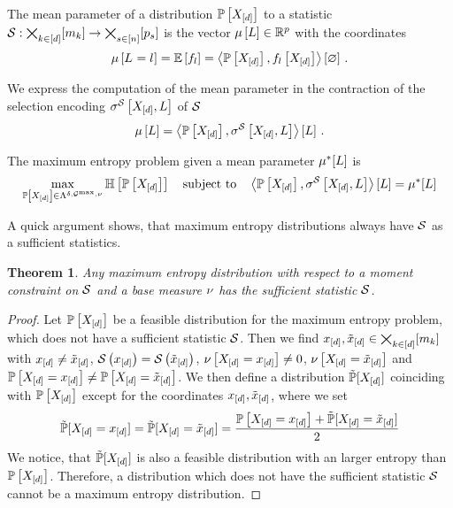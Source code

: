 \documentclass[aps,onecolumn,nofootinbib,pra]{article}
\newtheorem{theorem}{Theorem}
\begin{document}
    The mean parameter of a distribution $\mathbb{P}\left[X_{[d]}\right]$ to a statistic $\mathcal{S}:\bigtimes_{k\in[d]}[m_{k}]\rightarrow\bigtimes_{s\in[n]}[p_{s}]$ is the vector $\mu\left[L\right]\in\mathbb{R}^p$ with the coordinates
    \begin{align*}
        \mu\left[L_{}=l_{}\right] = \mathbb{E}\left[f_{l}\right] = \left\langle \mathbb{P}\left[X_{[d]}\right],f_{l}\left[X_{[d]}\right]\right\rangle \left[ \varnothing \right] \, .
    \end{align*}

    We express the computation of the mean parameter in the contraction of the selection encoding $\sigma^{\mathcal{S}}\left[X_{[d]},L\right]$ of $\mathcal{S}$
    \begin{align*}
        \mu\left[L\right] = \left\langle \mathbb{P}\left[X_{[d]}\right],\sigma^{\mathcal{S}}\left[X_{[d]},L\right]\right\rangle \left[ L \right] \, .
    \end{align*}

    The maximum entropy problem given a mean parameter $\mu^*[L]$ is
    \begin{align*}
        \max_{\mathbb{P}\left[X_{[d]}\right]\in\Lambda^{\delta,\mathcal{G}^{\mathrm{max}},\nu}} \mathbb{H}\left[\mathbb{P}\left[X_{[d]}\right]\right] \quad \text{subject to} \quad \left\langle \mathbb{P}\left[X_{[d]}\right],\sigma^{\mathcal{S}}\left[X_{[d]},L\right]\right\rangle \left[ L \right] = \mu^*[L]
    \end{align*}

    A quick argument shows, that maximum entropy distributions always have $\mathcal{S}$ as a sufficient statistics.

    \begin{theorem}
        \label{the:maxEntWithSufficientStatistic}
        Any maximum entropy distribution with respect to a moment constraint on $\mathcal{S}$ and a base measure $\nu$ has the sufficient statistic $\mathcal{S}$.
    \end{theorem}
    \begin{proof}
        Let $\mathbb{P}\left[X_{[d]}\right]$ be a feasible distribution for the maximum entropy problem, which does not have a sufficient statistic $\mathcal{S}$.
        Then we find $x_{[d]},\tilde{x}_{[d]}\in\bigtimes_{k\in[d]}[m_{k}]$ with $x_{[d]}\neq\tilde{x}_{[d]}$, $\mathcal{S}\left(x_{[d]}\right)=\mathcal{S}\left(\tilde{x}_{[d]}\right)$, $\nu\left[X_{[d]}=x_{[d]}\right]\neq0$, $\nu\left[X_{[d]}=\tilde{x}_{[d]}\right]$ and $\mathbb{P}\left[X_{[d]}=x_{[d]}\right]\neq\mathbb{P}\left[X_{[d]}=\tilde{x}_{[d]}\right]$.
        We then define a distribution $\tilde{\mathbb{P}}[X_{[d]}]$ coinciding with $\mathbb{P}\left[X_{[d]}\right]$ except for the coordinates $x_{[d]},\tilde{x}_{[d]}$, where we set
        \begin{align*}
            \tilde{\mathbb{P}}[X_{[d]}=x_{[d]}] = \tilde{\mathbb{P}}[X_{[d]}=\tilde{x}_{[d]}] = \frac{\mathbb{P}\left[X_{[d]}=x_{[d]}\right]+\tilde{\mathbb{P}}[X_{[d]}=\tilde{x}_{[d]}]}{2}
        \end{align*}
        We notice, that $\tilde{\mathbb{P}}[X_{[d]}]$ is also a feasible distribution with an larger entropy than $\mathbb{P}\left[X_{[d]}\right]$.
        Therefore, a distribution which does not have the sufficient statistic $\mathcal{S}$ cannot be a maximum entropy distribution.
    \end{proof}
\end{document}
